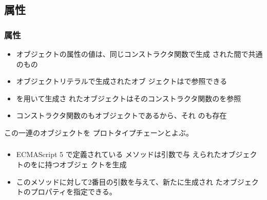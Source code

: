 \subsection{\protect{}属性}
\begin{frame}[containsverbatim]
 \frametitle{\protect{}属性}
 \begin{itemize}
  \item オブジェクトの属性の値は、同じコンストラクタ関数で生成
 された間で共通のもの
  \item オブジェクトリテラルで生成されたオブ
 ジェクトはで参照できる
  \item {}を用いて生成さ
 れたオブジェクトはそのコンストラクタ関数のを参照
  \item コンストラクタ関数のもオブジェクトであるから、それ
 のも存在
 \end{itemize}
 この一連のオブジェクトを
 プロトタイプチェーンとよぶ。
 \end{frame}
\begin{frame}[containsverbatim]
 \frametitle{\protect{}}
 \begin{itemize}
  \item ECMAScript 5 で定義されている  メソッドは引数で与
 えられたオブジェクトのをに持つオブジェ
        クトを生成
  \item このメソッドに対して2番目の引数を与えて、新たに生成され
 たオブジェクトのプロパティを指定できる。
 \end{itemize}
 \end{frame}
